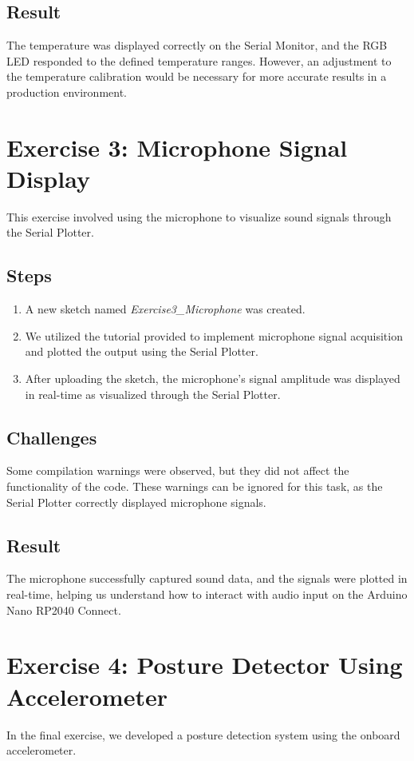 \documentclass[a4paper,12pt]{article}
\begin{document}
	\subsection{Result}
	The temperature was displayed correctly on the Serial Monitor, and the RGB LED responded to the defined temperature ranges. However, an adjustment to the temperature calibration would be necessary for more accurate results in a production environment.
	
	\section{Exercise 3: Microphone Signal Display}
	This exercise involved using the microphone to visualize sound signals through the Serial Plotter.
	
	\subsection{Steps}
	\begin{enumerate}
		\item A new sketch named \textit{Exercise3\_Microphone} was created.
		\item We utilized the tutorial provided to implement microphone signal acquisition and plotted the output using the Serial Plotter.
		\item After uploading the sketch, the microphone's signal amplitude was displayed in real-time as visualized through the Serial Plotter.
	\end{enumerate}
	
	\subsection{Challenges}
	Some compilation warnings were observed, but they did not affect the functionality of the code. These warnings can be ignored for this task, as the Serial Plotter correctly displayed microphone signals.
	
	\subsection{Result}
	The microphone successfully captured sound data, and the signals were plotted in real-time, helping us understand how to interact with audio input on the Arduino Nano RP2040 Connect.
	
	\section{Exercise 4: Posture Detector Using Accelerometer}
	In the final exercise, we developed a posture detection system using the onboard accelerometer.
	
\end{document}

